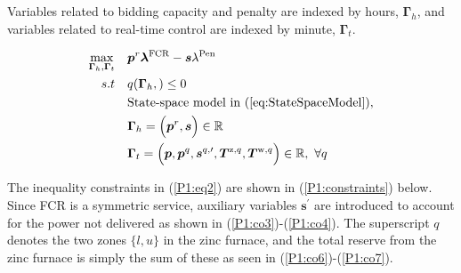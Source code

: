 \documentclass[lettersize,journal]{IEEEtran}
\begin{document}
Variables related to bidding capacity and penalty are indexed by hours, $\bm{\Gamma}_{h}$, and variables related to real-time control are indexed by minute, $\bm{\Gamma}_{t}$.

\begin{subequations}\label{P1:compact_model_fcr}
    \begin{align}
        \underset{\bm{\Gamma}_{h},\bm{\Gamma}_{t}}{\textrm{max}} \quad & \bm{p}^{r} \bm{\lambda}^{\text{FCR}} - \bm{s}\lambda^{\text{Pen}} \label{P1:eq1}
        \\
        s.t \quad                                                      & q(\bm{\Gamma}_{h}, ) \leq 0 \label{P1:eq2}                                                                                                                    \\
        \quad                                                          & \text{State-space model in } (\ref{eq:StateSpaceModel}), \label{P1:eq8}                                                                                       \\
        \quad
                                                                       & \bm{\Gamma}_{h} = \Bigl( \bm{p}^{r}, \bm{s} \Bigr) \in \mathbb{R}  \label{P1:eq9}                                                                             \\
        \quad
                                                                       & \bm{\Gamma}_{t} = \Bigl( \bm{p}, \bm{p}^{q}, \bm{s}^{q, \prime}, \bm{T}^{\text{z},q}, \bm{T}^{\text{w},q} \Bigr) \in \mathbb{R}, \ \forall{q} \label{P1:eq10}
    \end{align}
\end{subequations}

The inequality constraints in (\ref{P1:eq2}) are shown in (\ref{P1:constraints}) below. Since FCR is a symmetric service, auxiliary variables $\bm{s}^{\prime}$ are introduced to account for the power not delivered as shown in (\ref{P1:co3})-(\ref{P1:co4}). The superscript $q$ denotes the two zones $\{l, u\}$ in the zinc furnace, and the total reserve from the zinc furnace is simply the sum of these as seen in (\ref{P1:co6})-(\ref{P1:co7}).
\end{document}
